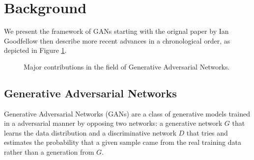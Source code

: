 
\section{Background}
We present the framework of GANs starting with the orignal paper by Ian Goodfellow \cite{goodfellow2014generative} then describe more recent advances in a chronological order, as depicted in Figure \ref{fig:background-timeline}. 

\begin{figure}
\centering
{}
\caption{Major contributions in the field of Generative Adversarial Networks.}
\label{fig:background-timeline}
\end{figure}



\subsection{Generative Adversarial Networks} 
Generative Adversarial Networks (GANs) are a class of generative models trained in a adversarial manner by opposing two networks: a generative network $G$ that learns the data distribution and a discriminative network $D$ that tries and estimates the probability that a given sample came from the real training data rather than a generation from $G$. 
 
